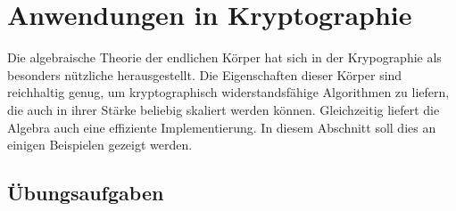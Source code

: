 %
%
%
\chapter{Anwendungen in Kryptographie
\label{buch:chapter:kryptographie}}
\rhead{}
Die algebraische Theorie der endlichen Körper hat sich
in der Krypographie als besonders nützliche herausgestellt.
Die Eigenschaften dieser Körper sind reichhaltig genug, um 
kryptographisch widerstandsfähige Algorithmen zu liefern, die
auch in ihrer Stärke beliebig skaliert werden können.
Gleichzeitig liefert die Algebra auch eine effiziente Implementierung.
In diesem Abschnitt soll dies an einigen Beispielen gezeigt werden.




%

\section*{Übungsaufgaben}
\begin{uebungsaufgaben}
\end{uebungsaufgaben}


